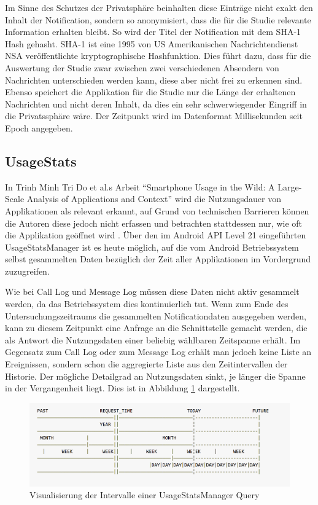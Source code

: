 Im Sinne des Schutzes der Privatsphäre beinhalten diese Einträge nicht exakt den Inhalt der Notification, sondern so anonymisiert, dass die für die Studie relevante Information erhalten bleibt.
So wird der Titel der Notification mit dem SHA-1 Hash\cite{sha1def} gehasht.
SHA-1 ist eine 1995 von US Amerikanischen Nachrichtendienst NSA veröffentlichte kryptographische Hashfunktion\cite{sha1proposal}.
Dies führt dazu, dass für die Auswertung der Studie zwar zwischen zwei verschiedenen Absendern von Nachrichten unterschieden werden kann, diese aber nicht frei zu erkennen sind.
Ebenso speichert die Applikation für die Studie nur die Länge der erhaltenen Nachrichten und nicht deren Inhalt, da dies ein sehr schwerwiegender Eingriff in die Privatssphäre wäre.
Der Zeitpunkt wird im Datenformat Millisekunden seit Epoch angegeben.


\subsection{UsageStats}

In Trinh Minh Tri Do et al.s Arbeit "`Smartphone Usage in the Wild: A Large-Scale Analysis of Applications and Context"' wird die Nutzungsdauer von Applikationen als relevant erkannt, auf Grund von technischen Barrieren können die Autoren diese jedoch nicht erfassen und betrachten stattdessen nur, wie oft die Applikation geöffnet wird \cite{do2011smartphone}.
Über den im Android API Level 21 eingeführten UsageStatsManager ist es heute möglich,
auf die vom Android Betriebssystem selbst gesammelten Daten bezüglich der Zeit aller Applikationen im Vordergrund zuzugreifen.
\par
Wie bei Call Log und Message Log müssen diese Daten nicht aktiv gesammelt werden, da das Betriebssystem dies kontinuierlich tut.
Wenn zum Ende des Untersuchungszeitraums die gesammelten Notificationdaten ausgegeben werden, kann zu diesem Zeitpunkt eine Anfrage an die Schnittstelle gemacht werden, die als Antwort die Nutzungsdaten einer beliebig wählbaren Zeitspanne erhält.
Im Gegensatz zum Call Log oder zum Message Log erhält man jedoch keine Liste an Ereignissen, sondern schon die aggregierte Liste aus den Zeitintervallen der Historie.
Der mögliche Detailgrad an Nutzungsdaten sinkt, je länger die Spanne in der Vergangenheit liegt.
Dies ist in Abbildung \ref{usagestatsvis} dargestellt.


\begin{figure}[h]
    \centering
    \includegraphics[width=\textwidth]{images/usagestats}
    \caption{Visualisierung der Intervalle einer UsageStatsManager Query\cite{usagestatsdoc}}
    \label{usagestatsvis}
\end{figure}


